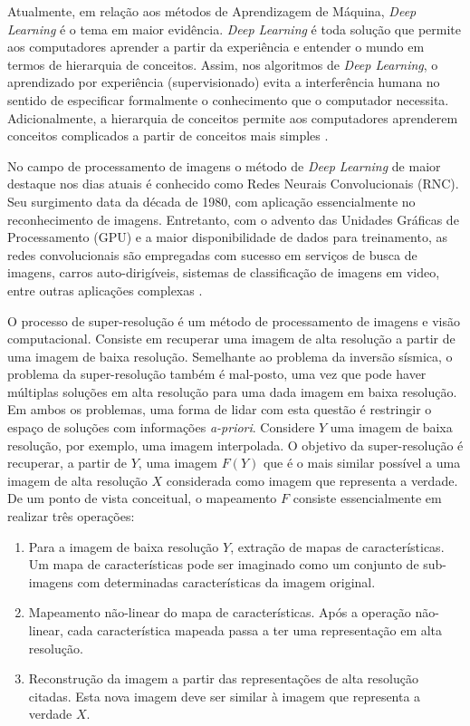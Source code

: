 Atualmente, em relação aos métodos de Aprendizagem de Máquina, \textit{Deep Learning} é o tema em
maior evidência. \textit{Deep Learning} é toda solução que permite aos
computadores aprender a partir da experiência e entender o mundo em
termos de hierarquia de conceitos.
Assim, nos algoritmos de \textit{Deep Learning}, o aprendizado
por experiência (supervisionado) evita a interferência
humana no sentido de especificar formalmente o conhecimento que o computador necessita.
Adicionalmente, a hierarquia de conceitos permite aos computadores aprenderem
conceitos complicados a partir de conceitos mais simples \citep{Gdfl16}.

No campo de
processamento de imagens o método de \textit{Deep Learning} de
maior destaque nos dias atuais é conhecido
como Redes Neurais Convolucionais (RNC). Seu surgimento
data da década de 1980, com aplicação essencialmente no reconhecimento de imagens.
Entretanto, com o advento das Unidades Gráficas de Processamento (GPU) e a maior
disponibilidade de dados para treinamento, as redes convolucionais
são empregadas com sucesso em serviços de busca de imagens, carros auto-dirigíveis,
sistemas de classificação de imagens em video, entre outras aplicações complexas \citep[p. 50]{Buduma15}.

O processo de super-resolução é um método de processamento de imagens e visão computacional.
Consiste em recuperar uma imagem de alta resolução a partir de uma imagem
de baixa resolução. Semelhante ao problema da inversão sísmica, o problema da super-resolução
também é mal-posto, uma vez que pode haver múltiplas soluções em alta resolução para uma dada imagem em baixa
resolução. Em ambos os problemas, uma forma de lidar com esta questão é restringir o espaço
de soluções com informações \textit{a-priori}. 
Considere $Y$ uma imagem de baixa resolução, por exemplo, uma
imagem interpolada. O objetivo da super-resolução é
recuperar, a partir de $Y$, uma imagem $F(Y)$ que é
o mais similar possível a uma imagem de alta resolução $X$
considerada como imagem que representa a verdade.
De um ponto de vista conceitual, o mapeamento $F$ consiste essencialmente em
realizar três operações:
\begin{enumerate}
 \item Para a imagem de baixa resolução $Y$, extração de mapas de características. Um mapa de características
 pode ser imaginado como um conjunto de sub-imagens com determinadas características da imagem original.
 \item Mapeamento não-linear do mapa de características. Após a operação não-linear, cada característica mapeada
 passa a ter uma representação em alta resolução.
 \item Reconstrução da imagem a partir das representações de alta resolução citadas. Esta nova imagem
 deve ser similar à imagem que representa a verdade $X$.
\end{enumerate}

